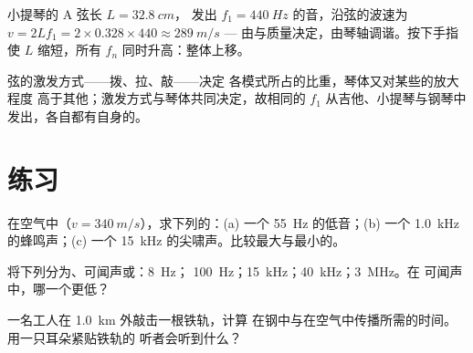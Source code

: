 \begin{example}[小提琴的 A 弦]\label{ex:g12:sound-acoustics:violin}
小提琴的 A 弦长 $L = \qty{32.8}{cm}$，
发出 $f_1 = \qty{440}{Hz}$ 的音，沿弦的波速为
$v = 2Lf_1 = 2 \times 0.328 \times 440 \approx \qty{289}{m/s}$ ---
由与质量决定，由琴轴调谐。按下手指
使 $L$ 缩短，所有 $f_n$ 同时升高：整体上移。
\end{example}

\begin{remark}[乐器为何不同]\label{rem:g12:sound-acoustics:instruments}
弦的激发方式——拨、拉、敲——决定
各模式所占的比重，琴体又对某些的放大程度
高于其他；激发方式与琴体共同决定，故相同的
$f_1$ 从吉他、小提琴与钢琴中发出，各自都有自身的。
\end{remark}

\section{练习}

\begin{exercise}[$\star$]\label{exo:g12:sound-acoustics:1}
在空气中（$v = \qty{340}{m/s}$），求下列的：(a) 一个
\qty{55}{Hz} 的低音；(b) 一个 \qty{1.0}{kHz} 的蜂鸣声；(c) 一个
\qty{15}{kHz} 的尖啸声。比较最大与最小的。
\end{exercise}

\begin{exercise}[$\star$]\label{exo:g12:sound-acoustics:2}
将下列分为、可闻声或：\qty{8}{Hz}；
\qty{100}{Hz}；\qty{15}{kHz}；\qty{40}{kHz}；\qty{3}{MHz}。在
可闻声中，哪一个更低？
\end{exercise}

\begin{exercise}[$\star$]\label{exo:g12:sound-acoustics:3}
一名工人在 \qty{1.0}{km} 外敲击一根铁轨，计算
在钢中与在空气中传播所需的时间。用一只耳朵紧贴铁轨的
听者会听到什么？
\end{exercise}

